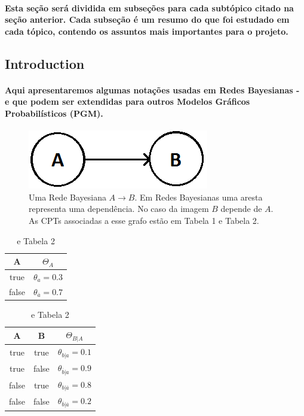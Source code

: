 \documentclass[a4paper,10pt]{article}
\theoremstyle{plain}
\begin{document}
\paragraph{
  Esta seção será dividida em subseções para cada subtópico citado na seção anterior. Cada
subseção é um resumo do que foi estudado em cada tópico, contendo os assuntos mais importantes
para o projeto.
}

\subsection{Introduction}

\paragraph{
  Aqui apresentaremos algumas notações usadas em Redes Bayesianas - e que podem ser extendidas para
outros Modelos Gráficos Probabilísticos (PGM).
}

\begin{figure}[h]
\centering\includegraphics[scale=0.5]{imgs/fig1.png}
\caption{Uma Rede Bayesiana $A \to B$. Em Redes Bayesianas uma aresta representa uma dependência.
  No caso da imagem $B$ depende de $A$. As CPTs associadas a esse grafo estão em Tabela 1 e
  Tabela 2.}
\end{figure}

\begin{table}[h]
\begin{center}
\captionsetup{justification=centering}
\caption{ e Tabela 2}
\begin{tabular}{c | c}
  A  & $\Theta_A$ \\
\hline
true & $\theta_a = 0.3$ \\
false& $\theta_{\overline{a}} = 0.7$ \\
\end{tabular}
\quad
\quad
\begin{tabular}{c c | c}
A & B & $\Theta_{B|A}$ \\
\hline
true & true & $\theta_{b|a} = 0.1$ \\
true & false & $\theta_{\overline{b}|a} = 0.9$ \\
false & true & $\theta_{b|\overline{a}} = 0.8$ \\
false & false & $\theta_{\overline{b}|\overline{a}} = 0.2$ \\
\end{tabular}
\end{center}
\end{table}
\end{document}
